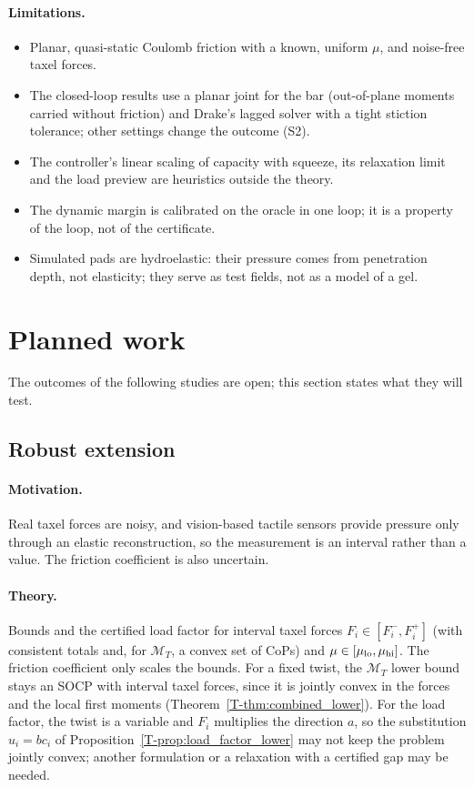 \documentclass[11pt,a4paper]{article}
\newcommand{\M}{\mathcal M}
\newcommand{\T}[1]{\ref{T-#1}}                       %
\begin{document}
\paragraph{Limitations.}
\begin{itemize}
    \item Planar, quasi-static Coulomb friction with a known, uniform $\mu$, and noise-free taxel forces.
    \item The closed-loop results use a planar joint for the bar (out-of-plane moments carried without friction) and Drake's lagged solver with a tight
    stiction tolerance; other settings change the outcome (S2).
    \item The controller's linear scaling of capacity with squeeze, its relaxation limit and the load preview are heuristics outside the theory.
    \item The dynamic margin is calibrated on the oracle in one loop; it is a property of the loop, not of the certificate.
    \item Simulated pads are hydroelastic: their pressure comes from penetration depth, not elasticity; they serve as test fields, not as a model of a
    gel.
\end{itemize}

\section{Planned work}
\label{sec:planned}
The outcomes of the following studies are open; this section states what they will test.

\subsection{Robust extension}
\label{sec:robust}
\paragraph{Motivation.} Real taxel forces are noisy, and vision-based tactile sensors provide pressure only through an elastic reconstruction, so the
measurement is an interval rather than a value. The friction coefficient is also uncertain.
\paragraph{Theory.} Bounds and the certified load factor for interval taxel forces $F_i\in[F_i^-,F_i^+]$ (with consistent totals and, for $\M_T$, a
convex set of CoPs) and $\mu\in[\mu_{\rm lo},\mu_{\rm hi}]$. The friction coefficient only scales the bounds. For a fixed twist, the $\M_T$ lower
bound stays an SOCP with interval taxel forces, since it is jointly convex in the forces and the local first moments (Theorem~\T{thm:combined_lower}).
For the load factor, the twist is a variable and $F_i$ multiplies the direction $a$, so the substitution $u_i=bc_i$ of Proposition~\T{prop:load_factor_lower} may not keep the problem jointly convex; another formulation or a relaxation with a certified gap may be needed.
\end{document}
